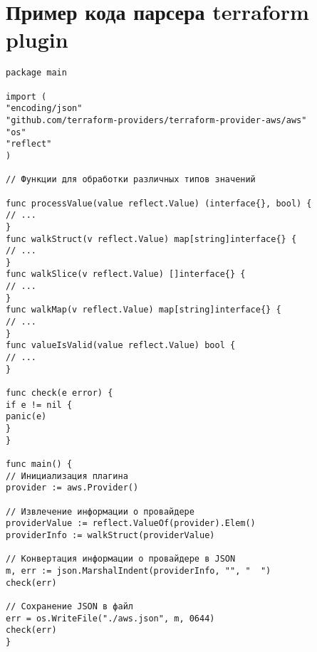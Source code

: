 ﻿\chapter{Пример кода парсера terraform plugin}\label{sec:appendix1}

\begin{verbatim}
package main

import (
"encoding/json"
"github.com/terraform-providers/terraform-provider-aws/aws"
"os"
"reflect"
)

// Функции для обработки различных типов значений

func processValue(value reflect.Value) (interface{}, bool) {
// ...
}
func walkStruct(v reflect.Value) map[string]interface{} {
// ...
}
func walkSlice(v reflect.Value) []interface{} {
// ...
}
func walkMap(v reflect.Value) map[string]interface{} {
// ...
}
func valueIsValid(value reflect.Value) bool {
// ...
}

func check(e error) {
if e != nil {
panic(e)
}
}

func main() {
// Инициализация плагина
provider := aws.Provider()

// Извлечение информации о провайдере
providerValue := reflect.ValueOf(provider).Elem()
providerInfo := walkStruct(providerValue)

// Конвертация информации о провайдере в JSON
m, err := json.MarshalIndent(providerInfo, "", "  ")
check(err)

// Сохранение JSON в файл
err = os.WriteFile("./aws.json", m, 0644)
check(err)
}
\end{verbatim}
